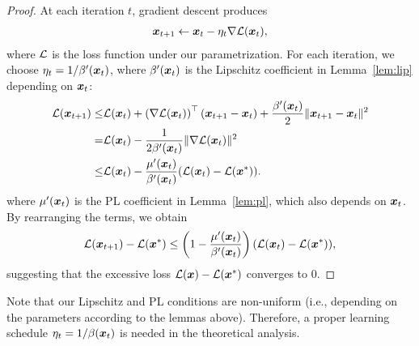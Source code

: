 \optim*
\begin{proof}
At each iteration $t$, gradient descent produces \begin{align}
    {\bm{x}}_{t+1} \gets {\bm{x}}_{t} - \eta_t \nabla  {\mathcal{L}}({\bm{x}}_t),
\end{align}
where ${\mathcal{L}}$ is the loss function under our parametrization. 
For each iteration, we choose $\eta_t = 1/\beta'({\bm{x}}_t)$, where $\beta'({\bm{x}}_t)$ is the Lipschitz coefficient in Lemma~\ref{lem:lip} depending on ${\bm{x}}_t$: \begin{align}
    {\mathcal{L}}({\bm{x}}_{t+1}) \le& {\mathcal{L}}({\bm{x}}_t) +  \left(\nabla {\mathcal{L}}({\bm{x}}_t) \right)^\top ({\bm{x}}_{t+1} - {\bm{x}}_t) + \frac{\beta'({\bm{x}}_t)}{2} \| {\bm{x}}_{t+1} - {\bm{x}}_{t} \|^2 \\
    =& {\mathcal{L}}({\bm{x}}_t) - \frac{1}{2\beta'({\bm{x}}_t)} \|\nabla {\mathcal{L}}({\bm{x}}_t) \|^2 \\
    \le& {\mathcal{L}}({\bm{x}}_t) - \frac{\mu'({\bm{x}}_t)}{\beta'({\bm{x}}_t)}({\mathcal{L}}({\bm{x}}_t) - {\mathcal{L}}({\bm{x}}^*)).
\end{align}
where $\mu'({\bm{x}}_t)$ is the PL coefficient in Lemma~\ref{lem:pl}, which also depends on ${\bm{x}}_t$.
By rearranging the terms, we obtain\begin{align}
        {\mathcal{L}}({\bm{x}}_{t+1}) - {\mathcal{L}}({\bm{x}}^*) \le \left(1 - \frac{\mu'({\bm{x}}_t)}{\beta'({\bm{x}}_t)}\right) ( {\mathcal{L}}({\bm{x}}_t) - {\mathcal{L}}({\bm{x}}^*)),
    \end{align}
    suggesting that the excessive loss ${\mathcal{L}}({\bm{x}}) - {\mathcal{L}}({\bm{x}}^*)$ converges to 0.
\end{proof}
Note that our Lipschitz and PL conditions are non-uniform (i.e., depending on the parameters according to the lemmas above). Therefore, a proper learning schedule $\eta_t = 1/\beta({\bm{x}}_t)$ is needed in the theoretical analysis.